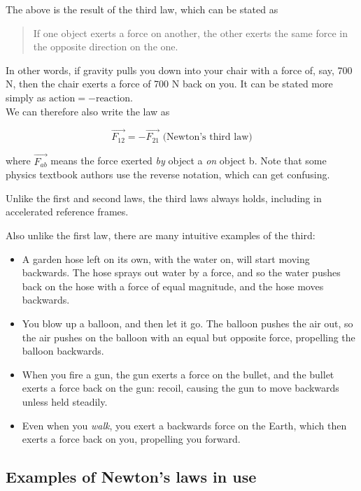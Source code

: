 The above is the result of the third law, which can be stated as

\begin{quote}
If one object exerts a force on another, the other exerts the same force in the opposite direction on the one.
\end{quote}

In other words, if gravity pulls you down into your chair with a force of, say, 700 N, then the chair exerts a force of 700 N back on you. It can be stated more simply as $\text{action} = -\text{reaction}$.\\
We can therefore also write the law as

\begin{equation}
\vec{F_{12}} = -\vec{F_{21}} \text{ (Newton's third law)} \label{eq:newton3}
\end{equation}

where $\vec{F_{ab}}$ means the force exerted \emph{by} object a \emph{on} object b. Note that some physics textbook authors use the reverse notation, which can get confusing.

Unlike the first and second laws, the third laws always holds, including in accelerated reference frames.

Also unlike the first law, there are many intuitive examples of the third:

\begin{itemize}
\item A garden hose left on its own, with the water on, will start moving backwards. The hose sprays out water by a force, and so the water pushes back on the hose with a force of equal magnitude, and the hose moves backwards.
\item You blow up a balloon, and then let it go. The balloon pushes the air out, so the air pushes on the balloon with an equal but opposite force, propelling the balloon backwards.
\item When you fire a gun, the gun exerts a force on the bullet, and the bullet exerts a force back on the gun: recoil, causing the gun to move backwards unless held steadily.
\item Even when you \emph{walk}, you exert a backwards force on the Earth, which then exerts a force back on you, propelling you forward.
\end{itemize}

\subsection{Examples of Newton's laws in use}

